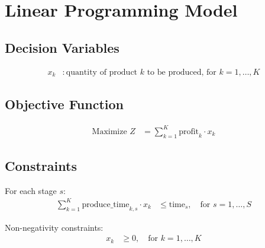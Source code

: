 \documentclass{article}
\begin{document}
\section*{Linear Programming Model}

\subsection*{Decision Variables}
\begin{align*}
x_k & : \text{quantity of product } k \text{ to be produced, for } k = 1, \ldots, K
\end{align*}

\subsection*{Objective Function}
\begin{align*}
\text{Maximize } Z & = \sum_{k=1}^{K} \text{profit}_k \cdot x_k
\end{align*}

\subsection*{Constraints}
For each stage \( s \):
\begin{align*}
\sum_{k=1}^{K} \text{produce\_time}_{k,s} \cdot x_k & \leq \text{time}_{s}, \quad \text{for } s = 1, \ldots, S
\end{align*}

Non-negativity constraints:
\begin{align*}
x_k & \geq 0, \quad \text{for } k = 1, \ldots, K
\end{align*}
\end{document}
